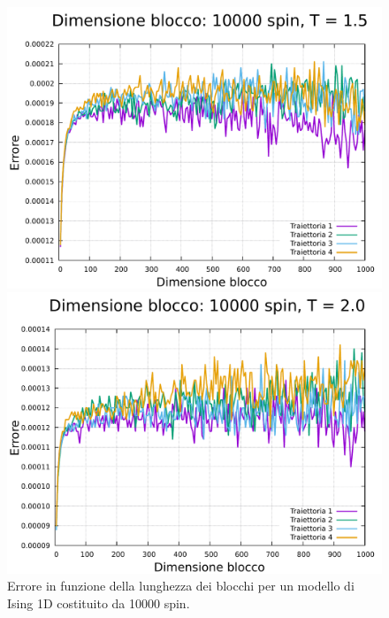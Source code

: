\begin{figure}[htbp]
    \begin{minipage}{0.45\textwidth}  
      \centering
      \includegraphics[page=1, width=\textwidth]{Immagini/simIsing1D/magn0.0/lblk/err_10000_1.5.pdf}
      \caption{$T\,=\,1.5$}
    \end{minipage}\hfill
    \begin{minipage}{0.45\textwidth}  
      \centering
      \includegraphics[page=1, width=\textwidth]{Immagini/simIsing1D/magn0.0/lblk/err_10000_2.0.pdf}
      \caption{$T\,=\,2.0$}
    \end{minipage}
    \caption{Errore in funzione della lunghezza dei blocchi per un modello di Ising 1D costituito da 10000 spin.}
\end{figure}

